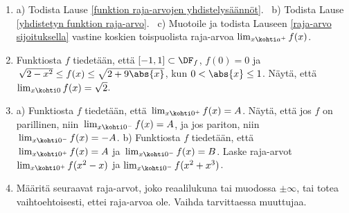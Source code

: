 \Harj
\begin{enumerate}

\item \label{H-V-2: todistuksia}
a) Todista Lause \ref{funktion raja-arvojen yhdistelysäännöt}. \
b) Todista Lause \ref{yhdistetyn funktion raja-arvo}. \
c) Muotoile ja todista Lauseen \ref{raja-arvo sijoituksella} vastine koskien toispuolista
raja-arvoa $\lim_{x \kohti a^+} f(x)$.

\item
Funktiosta $f$ tiedetään, että $[-1,1]\subset\DF_f$, $f(0)=0$ ja 
$\,\sqrt{2-x^2} \le f(x) \le \sqrt{2+9\abs{x}}$, kun $0 < \abs{x} \le 1$. Näytä, että
$\lim_{x \kohti 0}f(x)=\sqrt{2}$.

\item
a) Funktiosta $f$ tiedetään, että $\,\lim_{x \kohti 0^+}f(x)=A$. Näytä, että jos $f$ on 
parillinen, niin $\,\lim_{x \kohti 0^-}f(x)=A$, ja jos pariton, niin
$\,\lim_{x \kohti 0^-}f(x)=-A$. \newline
b) Funktiosta $f$ tiedetään, että $\,\lim_{x \kohti 0^+}f(x)=A$ ja
$\,\lim_{x \kohti 0^-}f(x)=B$. Laske raja-arvot $\lim_{x \kohti 0^+} f(x^2-x)$ ja
$\lim_{x \kohti 0^-} f(x^2+x^3)$. 

\item
Määritä seuraavat raja-arvot, joko reaalilukuna tai muodossa $\pm\infty$, tai totea 
vaihtoehtoisesti, ettei raja-arvoa ole. Vaihda tarvittaessa muuttujaa.
\begingroup
\allowdisplaybreaks


\end{enumerate}
